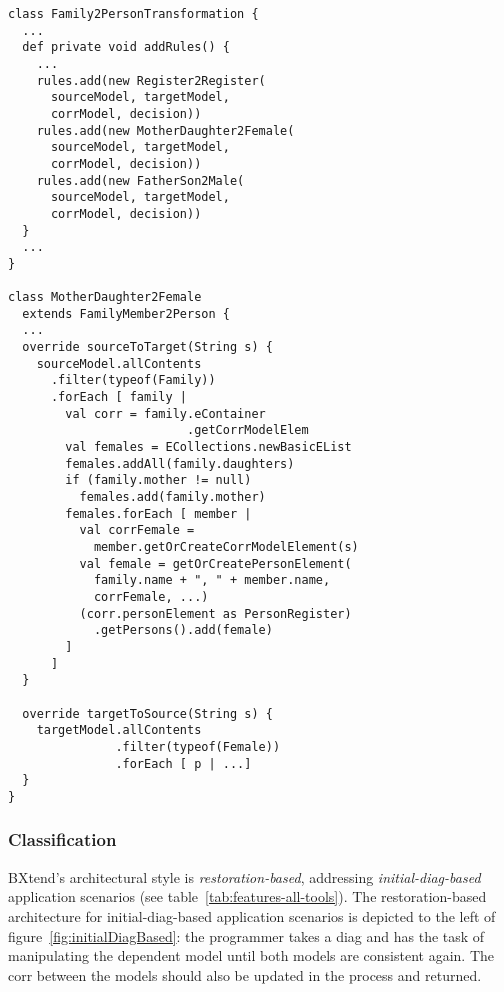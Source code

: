 \begin{lstlisting}[label={lst:bxtendSoln}, float=htb!, language=bxtend, caption={Rule orchestration and a specific rule with BXtend}]
class Family2PersonTransformation {
  ...
  def private void addRules() {
    ...
    rules.add(new Register2Register(
      sourceModel, targetModel, 
      corrModel, decision))
    rules.add(new MotherDaughter2Female(
      sourceModel, targetModel, 
      corrModel, decision))
    rules.add(new FatherSon2Male(
      sourceModel, targetModel, 
      corrModel, decision))
  }
  ...
}

class MotherDaughter2Female 
  extends FamilyMember2Person {
  ...
  override sourceToTarget(String s) {  
    sourceModel.allContents
      .filter(typeof(Family))
      .forEach [ family |
        val corr = family.eContainer
                         .getCorrModelElem
        val females = ECollections.newBasicEList
        females.addAll(family.daughters)
        if (family.mother != null) 
          females.add(family.mother)
        females.forEach [ member |
          val corrFemale = 
            member.getOrCreateCorrModelElement(s)
          val female = getOrCreatePersonElement(
	        family.name + ", " + member.name, 
	        corrFemale, ...)
          (corr.personElement as PersonRegister)
            .getPersons().add(female)
        ]
      ]
  }

  override targetToSource(String s) {
    targetModel.allContents
               .filter(typeof(Female))
               .forEach [ p | ...]
  }
}
\end{lstlisting}




\subsubsection{Classification}

BXtend's architectural style is \emph{restoration-based}, addressing \emph{initial-diag-based} application scenarios (see table~\ref{tab:features-all-tools}).
The re\-storation-based architecture for initial-diag-based application scenarios is depicted to the left of figure~\ref{fig:initialDiagBased}:  the programmer takes a diag and has the task of manipulating the dependent model until both models are consistent again.
The corr between the models should also be updated in the process and returned.

